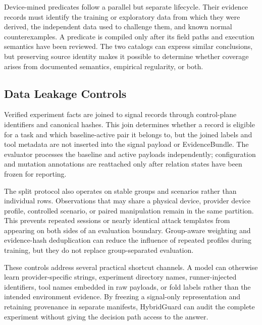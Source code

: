 Device-mined predicates follow a parallel but separate lifecycle. Their evidence records must identify the training or exploratory data from which they were derived, the independent data used to challenge them, and known normal counterexamples. A predicate is compiled only after its field paths and execution semantics have been reviewed. The two catalogs can express similar conclusions, but preserving source identity makes it possible to determine whether coverage arises from documented semantics, empirical regularity, or both.

\subsection{Data Leakage Controls}

Verified experiment facts are joined to signal records through control-plane identifiers and canonical hashes. This join determines whether a record is eligible for a task and which baseline-active pair it belongs to, but the joined labels and tool metadata are not inserted into the signal payload or EvidenceBundle. The evaluator processes the baseline and active payloads independently; configuration and mutation annotations are reattached only after relation states have been frozen for reporting.

The split protocol also operates on stable groups and scenarios rather than individual rows. Observations that may share a physical device, provider device profile, controlled scenario, or paired manipulation remain in the same partition. This prevents repeated sessions or nearly identical attack templates from appearing on both sides of an evaluation boundary. Group-aware weighting and evidence-hash deduplication can reduce the influence of repeated profiles during training, but they do not replace group-separated evaluation.

These controls address several practical shortcut channels. A model can otherwise learn provider-specific strings, experiment directory names, runner-injected identifiers, tool names embedded in raw payloads, or fold labels rather than the intended environment evidence. By freezing a signal-only representation and retaining provenance in separate manifests, HybridGuard can audit the complete experiment without giving the decision path access to the answer.
